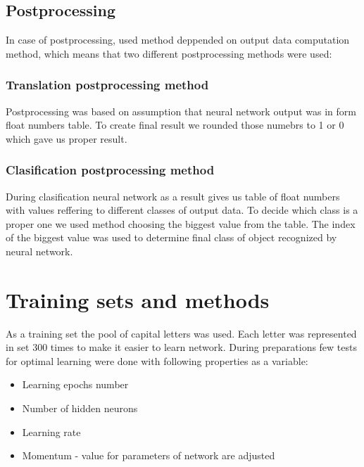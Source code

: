 \documentclass[a4paper]{article}
\begin{document}
\subsection{Postprocessing}
In case of postprocessing, used method deppended on output data computation method, which means that two different postprocessing methods were used:
\subsubsection{Translation postprocessing method}
Postprocessing was based on assumption that neural network output was in form float numbers table.
To create final result we rounded those numebrs to 1 or 0 which gave us proper result.
\subsubsection{Clasification postprocessing method}
During clasification neural network as a result gives us table of float numbers with values reffering to different classes of output data.
To decide which class is a proper one we used method choosing the biggest value from the table. The index of the biggest value was used to determine final class of object recognized by neural network. 

\section{Training sets and methods}
As a training set the pool of capital letters was used. Each letter was represented in set 300 times to make it easier to learn network. During preparations few tests for optimal learning were done with following properties as a variable:
\begin{itemize}
	\item Learning epochs number
	\item Number of hidden neurons
	\item Learning rate
	\item Momentum - value for parameters of network are adjusted
\end{itemize}
\end{document}
